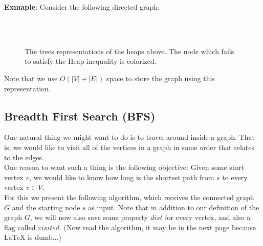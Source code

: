 \textbf{Exmaple}: Consider the following directed graph: \\ \\
\begin{figure}[h]
  \centering
  \begin{subfigure}[b]{0.25\textwidth}
         \\ 

  \end{subfigure}
\begin{subfigure}[b]{0.49\textwidth}
          \end{subfigure}
  \caption{The trees representations of the heaps above. The node which fails to satisfy the Heap inequality is colorized.}
\end{figure}



\begin{remark} Note that we use $O(|V|+|E|)$ space to store the graph using this representation.
\end{remark}



\subsection{Breadth First Search (BFS)}

One natural thing we might want to do is to travel around inside a graph. That is, we would like to visit all of the vertices in a graph in some order that relates to the edges. \\ 
One reason to want such a thing is the following objective: Given some start vertex $v$, we would like to know how long is the shortest path from $s$ to every vertex $v\in V$. \\ 
For this we present the following algorithm, which receives the connected graph $G$ and the starting node $s$ as input. Note that in addition to our definition of the graph $G$, we will now also save some property $dist$ for every vertex, and also a flag called $visited$.  (Now read the algorithm, it may be in the next page because LaTeX is dumb...)

